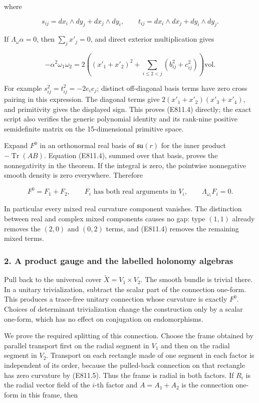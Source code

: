 where

\[
 s_{ij}=dx_i\wedge dy_j+dx_j\wedge dy_i,
 \qquad t_{ij}=dx_i\wedge dx_j+dy_i\wedge dy_j.
\]

If \(\Lambda_\omega\alpha=0\), then \(\sum_jx'_j=0\), and direct
exterior multiplication gives

\[
 -\alpha^2\omega_1\omega_2
 =2\left((x'_1+x'_2)^2+
          \sum_{i\le2<j}(b_{ij}^2+c_{ij}^2)\right)\mathrm{vol}.
 \tag{E811.4}
\]

For example \(s_{ij}^2=t_{ij}^2=-2e_ie_j\); distinct off-diagonal basis
terms have zero cross pairing in this expression. The diagonal terms
give \(2(x'_1+x'_2)(x'_3+x'_4)\), and primitivity gives the displayed
sign. This proves (E811.4) directly; the exact script also verifies the
generic polynomial identity and its rank-nine positive semidefinite
matrix on the 15-dimensional primitive space.

Expand \(F^0\) in an orthonormal real basis of \(\mathfrak{su}(r)\) for
the inner product \(-\operatorname{Tr}(AB)\). Equation (E811.4), summed
over that basis, proves the nonnegativity in the theorem. If the
integral is zero, the pointwise nonnegative smooth density is zero
everywhere. Therefore

\[
 F^0=F_1+F_2,
 \qquad F_i\text{ has both real arguments in }V_i,
 \qquad\Lambda_{\omega_i}F_i=0.
 \tag{E811.5}
\]

In particular every mixed real curvature component vanishes. The
distinction between real and complex mixed components causes no gap:
type \((1,1)\) already removes the \((2,0)\) and \((0,2)\) terms, and
(E811.4) removes the remaining mixed terms.

\subsubsection{2. A product gauge and the labelled holonomy
algebras}\label{a-product-gauge-and-the-labelled-holonomy-algebras}

Pull back to the universal cover \(\widetilde X=V_1\times V_2\). The
smooth bundle is trivial there. In a unitary trivialization, subtract
the scalar part of the connection one-form. This produces a trace-free
unitary connection whose curvature is exactly \(F^0\). Choices of
determinant trivialization change the construction only by a scalar
one-form, which has no effect on conjugation on endomorphisms.

We prove the required splitting of this connection. Choose the frame
obtained by parallel transport first on the radial segment in \(V_1\)
and then on the radial segment in \(V_2\). Transport on each rectangle
made of one segment in each factor is independent of its order, because
the pulled-back connection on that rectangle has zero curvature by
(E811.5). Thus the frame is radial in both factors. If \(R_i\) is the
radial vector field of the \(i\)-th factor and \(A=A_1+A_2\) is the
connection one-form in this frame, then

